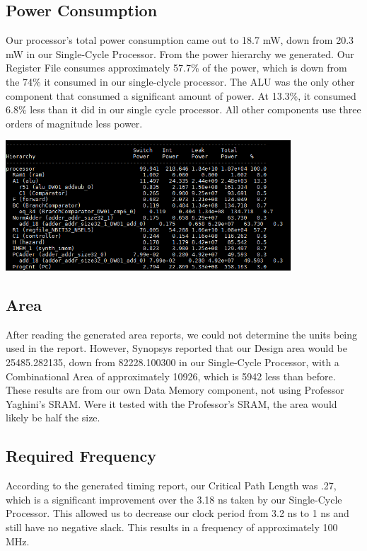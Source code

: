 \documentclass{article}
\begin{document}
\subsection{Power Consumption}
Our processor's total power consumption came out to 18.7 mW, down from 20.3  mW in our Single-Cycle Processor. From the power hierarchy we generated. Our Register File consumes approximately 57.7\% of the power, which is down from the 74\% it consumed in our single-clycle processor. The ALU was the only other component that consumed a significant amount of power. At 13.3\%, it consumed 6.8\% less than it did in our single cycle processor. All other components use three orders of magnitude less power.

\includegraphics[width=0.8\textwidth]{reportPower.png} \\

\subsection{Area}
After reading the generated area reports, we could not determine the units being used in the report. However, Synopsys reported that our Design area would be 25485.282135, down from 82228.100300 in our Single-Cycle Processor, with a Combinational Area of approximately 10926, which is 5942 less than before. These results are from our own Data Memory component, not using Professor Yaghini's SRAM. Were it tested with the Professor's SRAM, the area would likely be half the size.

\subsection{Required Frequency}
According to the generated timing report, our Critical Path Length was .27, which is a significant improvement over the 3.18 ns taken by our Single-Cycle Processor. This allowed us to decrease our clock period from 3.2 ns to 1 ns and still have no negative slack. This results in a frequency of approximately 100 
MHz.
\end{document}
